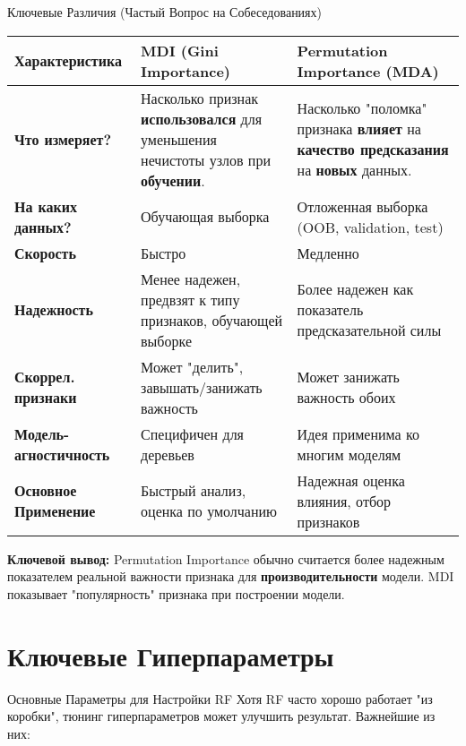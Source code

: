 \begin{alerttextbox}{Ключевые Различия (Частый Вопрос на Собеседованиях)}
    \begin{center}
    \begin{tabular}{|l|p{5.5cm}|p{5.5cm}|}
        \hline
        \textbf{Характеристика} & \textbf{MDI (Gini Importance)} & \textbf{Permutation Importance (MDA)} \\
        \hline
        \textbf{Что измеряет?} & Насколько признак \textbf{использовался} для уменьшения нечистоты узлов при \textbf{обучении}. & Насколько "поломка" признака \textbf{влияет} на \textbf{качество предсказания} на \textbf{новых} данных. \\
        \hline
        \textbf{На каких данных?} & Обучающая выборка & Отложенная выборка (OOB, validation, test) \\
        \hline
        \textbf{Скорость} & Быстро & Медленно \\
        \hline
        \textbf{Надежность} & Менее надежен, предвзят к типу признаков, обучающей выборке & Более надежен как показатель предсказательной силы \\
        \hline
        \textbf{Скоррел. признаки} & Может "делить", завышать/занижать важность & Может занижать важность обоих \\
        \hline
        \textbf{Модель-агностичность} & Специфичен для деревьев & Идея применима ко многим моделям \\
        \hline
        \textbf{Основное Применение} & Быстрый анализ, оценка по умолчанию & Надежная оценка влияния, отбор признаков \\
        \hline
    \end{tabular}
    \end{center}
    \textbf{Ключевой вывод:} Permutation Importance обычно считается более надежным показателем реальной важности признака для \textbf{производительности} модели. MDI показывает "популярность" признака при построении модели.
\end{alerttextbox}

\section{Ключевые Гиперпараметры}

\begin{textbox}{Основные Параметры для Настройки RF}
    Хотя RF часто хорошо работает "из коробки", тюнинг гиперпараметров может улучшить результат. Важнейшие из них:
\end{textbox}

